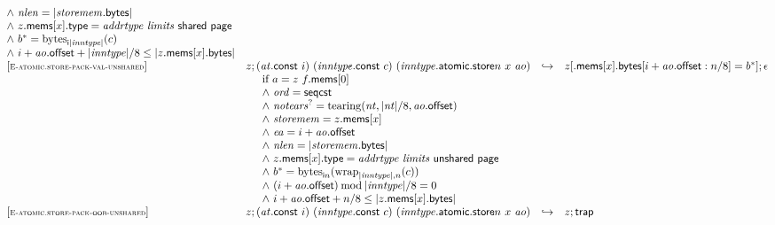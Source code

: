 $$\begin{array}[t]{@{}lrcl@{}l@{}}
{\begin{array}[t]{@{}l@{}}
{\land}~ {\mathit{nlen}} = {|{\mathit{storemem}}{.}\mathsf{bytes}|} \\
{\land}~ z{.}\mathsf{mems}{}[x]{.}\mathsf{type} = {\mathit{addrtype}}~{\mathit{limits}}~\mathsf{shared}~\mathsf{page} \\
{\land}~ {b^\ast} = {{\mathrm{bytes}}}_{{\mathsf{i}}{{|{\mathit{inntype}}|}}}(c) \\
{\land}~ i + {\mathit{ao}}{.}\mathsf{offset} + {|{\mathit{inntype}}|} / 8 \leq {|z{.}\mathsf{mems}{}[x]{.}\mathsf{bytes}|} \\
\end{array}
} \\
{[\textsc{\scriptsize E{-}atomic.store{-}pack{-}val{-}unshared}]} \quad & z ; ({\mathit{at}}{.}\mathsf{const}~i)~({\mathit{inntype}}{.}\mathsf{const}~c)~({{\mathit{inntype}}{.}\mathsf{atomic}{.}\mathsf{store}}{n}~x~{\mathit{ao}}) & \hookrightarrow & z{}[{.}\mathsf{mems}{}[x]{.}\mathsf{bytes}{}[i + {\mathit{ao}}{.}\mathsf{offset} : n / 8] = {b^\ast}] ; \epsilon &  \\
& \multicolumn{4}{@{}l@{}}{\quad
\quad
\begin{array}[t]{@{}l@{}}
\mbox{if}~ a = z~f{.}\mathsf{mems}{}[0] \\
{\land}~ {\mathit{ord}} = \mathsf{seqcst} \\
{\land}~ {{\mathit{notears}}^?} = {\mathrm{tearing}}({\mathit{nt}}, {|{\mathit{nt}}|} / 8, {\mathit{ao}}{.}\mathsf{offset}) \\
{\land}~ {\mathit{storemem}} = z{.}\mathsf{mems}{}[x] \\
{\land}~ {\mathit{ea}} = i + {\mathit{ao}}{.}\mathsf{offset} \\
{\land}~ {\mathit{nlen}} = {|{\mathit{storemem}}{.}\mathsf{bytes}|} \\
{\land}~ z{.}\mathsf{mems}{}[x]{.}\mathsf{type} = {\mathit{addrtype}}~{\mathit{limits}}~\mathsf{unshared}~\mathsf{page} \\
{\land}~ {b^\ast} = {{\mathrm{bytes}}}_{{\mathsf{i}}{n}}({{\mathrm{wrap}}}_{{|{\mathit{inntype}}|}, n}(c)) \\
{\land}~ (i + {\mathit{ao}}{.}\mathsf{offset}) \mathbin{\mathrm{mod}} {|{\mathit{inntype}}|} / 8 = 0 \\
{\land}~ i + {\mathit{ao}}{.}\mathsf{offset} + n / 8 \leq {|z{.}\mathsf{mems}{}[x]{.}\mathsf{bytes}|} \\
\end{array}
} \\
{[\textsc{\scriptsize E{-}atomic.store{-}pack{-}oob{-}unshared}]} \quad & z ; ({\mathit{at}}{.}\mathsf{const}~i)~({\mathit{inntype}}{.}\mathsf{const}~c)~({{\mathit{inntype}}{.}\mathsf{atomic}{.}\mathsf{store}}{n}~x~{\mathit{ao}}) & \hookrightarrow & z ; \mathsf{trap} &  \\

\end{array}$$
